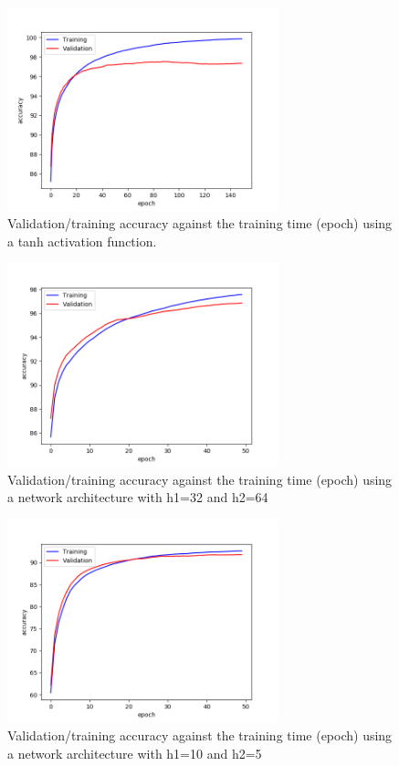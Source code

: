 \documentclass[a4paper]{article}
\begin{document}
\begin{enumerate}
\begin{figure}
\centering
\includegraphics[width=0.7\textwidth]{epoch3.png}
\caption{\label{fig:tanh}Validation/training accuracy against the training time (epoch) using a tanh activation function.}
\end{figure}
\begin{figure}
	\centering
	\includegraphics[width=0.7\textwidth]{arch2.png}
	\caption{\label{fig:arch2}Validation/training accuracy against the training time (epoch) using a network architecture with h1=32 and h2=64}
\end{figure}
\begin{figure}
	\centering
	\includegraphics[width=0.7\textwidth]{arch3.png}
	\caption{\label{fig:arch3}Validation/training accuracy against the training time (epoch) using a network architecture with h1=10 and h2=5}
\end{figure}


\end{enumerate}
\end{document}
